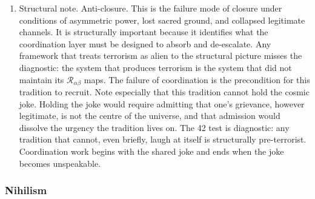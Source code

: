 \documentclass[
]{article}
\begin{document}
\begin{enumerate}
  justifies the violence. It survives by refreshing grievance and
  rejecting any settlement that does not include full inversion.
  Impermanence is not navigated; it is weaponised.
\item
  Structural note. Anti-closure. This is the failure mode of closure
  under conditions of asymmetric power, lost sacred ground, and
  collapsed legitimate channels. It is structurally important because it
  identifies what the coordination layer must be designed to absorb and
  de-escalate. Any framework that treats terrorism as alien to the
  structural picture misses the diagnostic: the system that produces
  terrorism is the system that did not maintain its
  \(\mathcal{R}_{\alpha\beta}\) maps. The failure of coordination is the
  precondition for this tradition to recruit. Note especially that this
  tradition cannot hold the cosmic joke. Holding the joke would require
  admitting that one's grievance, however legitimate, is not the centre
  of the universe, and that admission would dissolve the urgency the
  tradition lives on. The 42 test is diagnostic: any tradition that
  cannot, even briefly, laugh at itself is structurally pre-terrorist.
  Coordination work begins with the shared joke and ends when the joke
  becomes unspeakable.
\end{enumerate}

\subsubsection{Nihilism}\label{nihilism}
\end{document}

